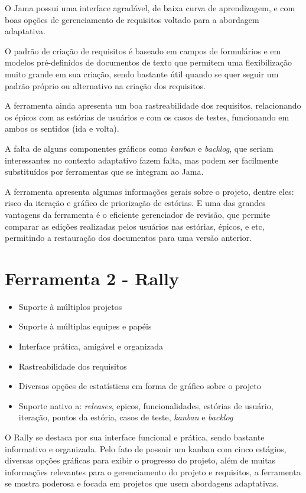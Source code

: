 O Jama possui uma interface agradável, de baixa curva de aprendizagem, e com boas opções de gerenciamento de requisitos voltado para a abordagem adaptativa.

O padrão de criação de requisitos é baseado em campos de formulários e em modelos pré-definidos de documentos de texto que permitem uma flexibilização muito grande em sua criação, sendo bastante útil quando se quer seguir um padrão próprio ou alternativo na criação dos requisitos.

A ferramenta ainda apresenta um boa rastreabilidade dos requisitos, relacionando os épicos com as estórias de usuários e com os casos de testes, funcionando em ambos os sentidos (ida e volta).

A falta de alguns componentes gráficos como \emph{kanban} e \emph{backlog}, que seriam interessantes no contexto adaptativo fazem falta, mas podem ser facilmente substituídos por ferramentas que se integram ao Jama.

A ferramenta apresenta algumas informações gerais sobre o projeto, dentre eles: risco da iteração e gráfico de priorização de estórias. E uma das grandes vantagens da ferramenta é o eficiente gerenciador de revisão, que permite comparar as edições realizadas pelos usuários nas estórias, épicos, e etc, permitindo a restauração dos documentos para uma versão anterior.

\section{Ferramenta 2 - Rally}
\begin{itemize}
  \item Suporte à múltiplos projetos
  \item Suporte à múltiplas equipes e papéis
  \item Interface prática, amigável e organizada
  \item Rastreabilidade dos requisitos
  \item Diversas opções de estatísticas em forma de gráfico sobre o projeto
  \item Suporte nativo a: \emph{releases}, epicos, funcionalidades, estórias de usuário, iteração, pontos da estória, casos de teste, \emph{kanban} e \emph{backlog}
\end{itemize}

O Rally se destaca por sua interface funcional e prática, sendo bastante informativo e organizada. Pelo fato de possuir um kanban com cinco estágios, diversas opções gráficas para exibir o progresso do projeto, além de muitas informações relevantes para o gerenciamento do projeto e requisitos, a ferramenta se mostra poderosa e focada em projetos que usem abordagens adaptativas.

